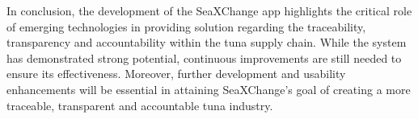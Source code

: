 	
\noindent In conclusion, the development of the SeaXChange app highlights the critical role of emerging technologies in providing solution regarding the traceability, transparency and accountability within the tuna supply chain. While the system has demonstrated strong potential, continuous improvements are still needed to ensure its effectiveness. Moreover, further development and usability enhancements will be essential in attaining SeaXChange's goal of creating a more traceable, transparent and accountable tuna industry.


